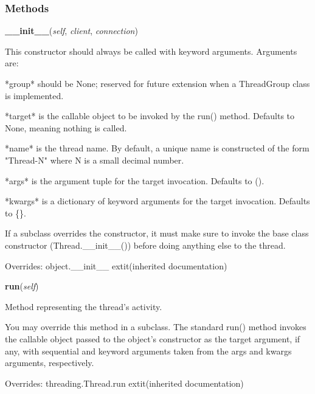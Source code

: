 
  \subsubsection{Methods}

    \vspace{0.5ex}

\hspace{.8\funcindent}\begin{boxedminipage}{\funcwidth}

    \raggedright \textbf{\_\_init\_\_}(\textit{self}, \textit{client}, \textit{connection})

\setlength{\parskip}{2ex}
    This constructor should always be called with keyword arguments. 
    Arguments are:

    *group* should be None; reserved for future extension when a 
    ThreadGroup class is implemented.

    *target* is the callable object to be invoked by the run() method. 
    Defaults to None, meaning nothing is called.

    *name* is the thread name. By default, a unique name is constructed of 
    the form "Thread-N" where N is a small decimal number.

    *args* is the argument tuple for the target invocation. Defaults to ().

    *kwargs* is a dictionary of keyword arguments for the target 
    invocation. Defaults to \{\}.

    If a subclass overrides the constructor, it must make sure to invoke 
    the base class constructor (Thread.\_\_init\_\_()) before doing 
    anything else to the thread.

\setlength{\parskip}{1ex}
      Overrides: object.\_\_init\_\_ 	extit{(inherited documentation)}

    \end{boxedminipage}

    \vspace{0.5ex}

\hspace{.8\funcindent}\begin{boxedminipage}{\funcwidth}

    \raggedright \textbf{run}(\textit{self})

\setlength{\parskip}{2ex}
    Method representing the thread's activity.

    You may override this method in a subclass. The standard run() method 
    invokes the callable object passed to the object's constructor as the 
    target argument, if any, with sequential and keyword arguments taken 
    from the args and kwargs arguments, respectively.

\setlength{\parskip}{1ex}
      Overrides: threading.Thread.run 	extit{(inherited documentation)}

    \end{boxedminipage}


